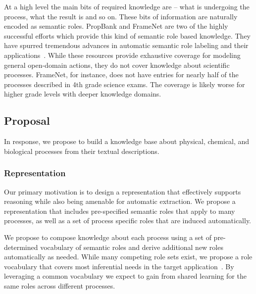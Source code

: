 At a high level the main bits of required knowledge are -- what is undergoing the process, what the result is and so on. 
These bits of information are naturally encoded as semantic roles.
PropBank and FrameNet are two of the highly successful efforts which provide this kind of semantic role based knowledge.
They have spurred tremendous advances in automatic semantic role labeling and their applications~\cite{}.
While these resources provide exhaustive coverage for modeling general open-domain actions,
they do not cover knowledge about scientific processes. 
FrameNet, for instance, does not have entries for nearly half of the processes described in 4th grade science exams. 
The coverage is likely worse for higher grade levels with deeper knowledge domains. 

\subsection{Proposal}

In response, we propose to build a knowledge base about physical, chemical, and biological processes from their textual descriptions. 

\subsubsection*{Representation}

Our primary motivation is to design a representation that effectively supports reasoning while also being amenable for automatic extraction.
We propose a representation that includes pre-specified semantic roles that apply to many processes, as well as a set of process specific roles that are induced automatically.

We propose to compose knowledge about each process using a set of pre-determined vocabulary of semantic roles and derive additional new roles automatically as needed.
While many competing role sets exist, we propose a role vocabulary that covers most inferential needs in the target application~\cite{louvan2015:kcap}.
By leveraging a common vocabulary we expect to gain from shared learning for the same roles across different processes.

